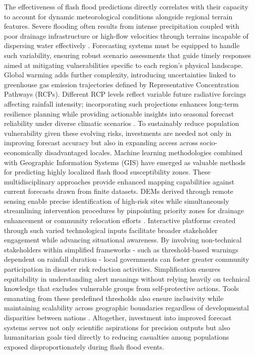 The effectiveness of flash flood predictions directly correlates with their capacity to account for dynamic meteorological conditions alongside regional terrain features. Severe flooding often results from intense precipitation coupled with poor drainage infrastructure or high-flow velocities through terrains incapable of dispersing water effectively \citep{Abegaz2024}. Forecasting systems must be equipped to handle such variability, ensuring robust scenario assessments that guide timely responses aimed at mitigating vulnerabilities specific to each region's physical landscape.
Global warming adds further complexity, introducing uncertainties linked to greenhouse gas emission trajectories defined by Representative Concentration Pathways (RCPs). Different RCP levels reflect variable future radiative forcings affecting rainfall intensity; incorporating such projections enhances long-term resilience planning while providing actionable insights into seasonal forecast reliability under diverse climatic scenarios \citep{AlRawas2024}.
To sustainably reduce population vulnerability given these evolving risks, investments are needed not only in improving forecast accuracy but also in expanding access across socio-economically disadvantaged locales. Machine learning methodologies combined with Geographic Information Systems (GIS) have emerged as valuable methods for predicting highly localized flash flood susceptibility zones. These multidisciplinary approaches provide enhanced mapping capabilities against current forecasts drawn from finite datasets. DEMs derived through remote sensing enable precise identification of high-risk sites while simultaneously streamlining intervention procedures by pinpointing priority zones for drainage enhancement or community relocation efforts \citep{Pham2020}.
Interactive platforms created through such varied technological inputs facilitate broader stakeholder engagement while advancing situational awareness. By involving non-technical stakeholders within simplified frameworks - such as threshold-based warnings dependent on rainfall duration - local governments can foster greater community participation in disaster risk reduction activities. Simplification ensures equitability in understanding alert meanings without relying heavily on technical knowledge that excludes vulnerable groups from self-protective actions. Tools emanating from these predefined thresholds also ensure inclusivity while maintaining scalability across geographic boundaries regardless of developmental disparities between nations \citep{Javelle2016}.
Altogether, investment into improved forecast systems serves not only scientific aspirations for precision outputs but also humanitarian goals tied directly to reducing casualties among populations exposed disproportionately during flash flood events.


